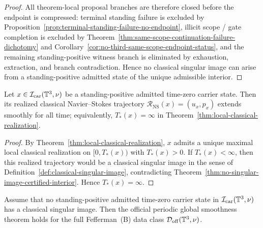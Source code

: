 \begin{proof}
All theorem-local proposal branches are therefore closed before the endpoint is compressed: terminal standing failure is excluded by Proposition~\ref{prop:terminal-standing-failure-no-endpoint}, illicit scope / gate completion is excluded by Theorem~\ref{thm:same-scope-continuation-failure-dichotomy} and Corollary~\ref{cor:no-third-same-scope-endpoint-status}, and the remaining standing-positive witness branch is eliminated by exhaustion, extraction, and branch contradiction. Hence no classical singular image can arise from a standing-positive admitted state of the unique admissible interior.
\end{proof}

\begin{corollary}\label{cor:global-smoothness-realized-class}
Let $x\in\mathcal I_{\mathrm{car}}(\mathbb{T}^3,\nu)$ be a standing-positive admitted time-zero carrier state.
Then its realized classical Navier--Stokes trajectory
$\mathcal R_{\mathrm{NS}}(x)=(u_x,p_x)$ extends smoothly for all time; equivalently,
$T_*(x)=\infty$ in Theorem~\ref{thm:local-classical-realization}.
\end{corollary}

\begin{proof}
By Theorem~\ref{thm:local-classical-realization}, $x$ admits a unique maximal local classical
realization on $[0,T_*(x))$ with $T_*(x)>0$. If $T_*(x)<\infty$, then this realized trajectory would
be a classical singular image in the sense of Definition~\ref{def:classical-singular-image},
contradicting Theorem~\ref{thm:no-singular-image-certified-interior}. Hence $T_*(x)=\infty$.
\end{proof}

\begin{proposition}\label{prop:full-class-reduction-official}
Assume that no standing-positive admitted time-zero carrier state in
$\mathcal I_{\mathrm{car}}(\mathbb{T}^3,\nu)$ has a classical singular image. Then the official periodic
global smoothness theorem holds for the full Fefferman~(B) data class
$\mathcal D_{\mathrm{off}}(\mathbb{T}^3,\nu)$.
\end{proposition}


